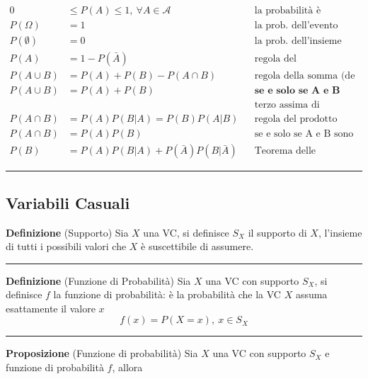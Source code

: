 \documentclass[
  11pt,
]{book}
\theoremstyle{mytheoremstyle}
\theoremstyle{mydefstyle}
\begin{document}
\begin{align*}
0&\le P(A) \le 1,~\forall A\in\mathscr{A} &&\text{la probabilità è compresa tra 0 e 1.} \\ 
 P(\Omega)&=1 &&\text{la prob. dell'evento certo è 1,} \\ 
P(\emptyset)&=0 &&\text{la prob. dell'insieme vuoto è zero.} \\ 
P(A)&=1-P(\bar A) &&\text{regola del complementare} \\ 
P(A\cup B)&=P(A)+P(B)-P(A\cap B) &&\text{regola della somma (de Morgan)} \\ 
P(A\cup B)&=P(A)+P(B) &&\textbf{se e solo se A e B sono incompatibili:} \\ 
& &&\text{terzo assima di Kolmogorov} \\ 
P(A\cap B)&=P(A)P(B|A)=P(B)P(A|B) &&\text{regola del prodotto (chain rule)} \\ 
P(A\cap B)&=P(A)P(B) &&\text{se e solo se A e B sono indipendenti} \\ 
P(B)&=P(A)P(B|A)+P(\bar A)P(B|\bar A) &&\text{Teorema delle probabilità totali} 
\end{align*}

\begin{center}\rule{0.5\linewidth}{0.5pt}\end{center}

\subsection{Variabili Casuali}\label{variabili-casuali-1}

\textbf{Definizione} (Supporto)
Sia \(X\) una VC, si definisce \(S_X\) il supporto di \(X\), l'insieme di tutti i possibili valori che \(X\) è suscettibile di assumere.

\begin{center}\rule{0.5\linewidth}{0.5pt}\end{center}

\textbf{Definizione} (Funzione di Probabilità)
Sia \(X\) una VC con supporto \(S_X\), si definisce \(f\) la funzione di probabilità:
è la probabilità che la VC \(X\) assuma esattamente il valore \(x\)
\[
f(x)=P(X=x), ~x\in S_X
\]

\begin{center}\rule{0.5\linewidth}{0.5pt}\end{center}

\textbf{Proposizione} (Funzione di probabilità)
Sia \(X\) una VC con supporto \(S_X\) e funzione di probabilità \(f\), allora
\end{document}
